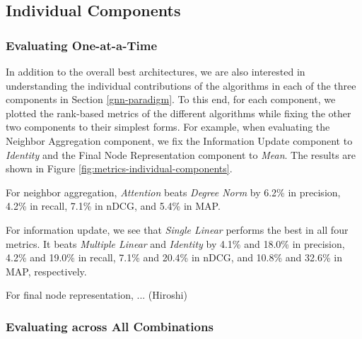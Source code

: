 \documentclass{article}
\begin{document}
\subsection{Individual Components} \label{eval-individual-components}

\subsubsection{Evaluating One-at-a-Time} \label{eval-one-at-a-time}



In addition to the overall best architectures, we are also interested in understanding the individual contributions of the algorithms in each of the three components in Section \ref{gnn-paradigm}. To this end, for each component, we plotted the rank-based metrics of the different algorithms while fixing the other two components to their simplest forms. For example, when evaluating the Neighbor Aggregation component, we fix the Information Update component to \textit{Identity} and the Final Node Representation component to \textit{Mean}. The results are shown in Figure \ref{fig:metrics-individual-components}.

For neighbor aggregation, \textit{Attention} beats \textit{Degree Norm} by 6.2\% in precision, 4.2\% in recall, 7.1\% in nDCG, and 5.4\% in MAP.

For information update, we see that \textit{Single Linear} performs the best in all four metrics. It beats \textit{Multiple Linear} and \textit{Identity} by 4.1\% and 18.0\% in precision, 4.2\% and 19.0\% in recall, 7.1\% and 20.4\% in nDCG, and 10.8\% and 32.6\% in MAP, respectively.

For final node representation, ... (Hiroshi)



\subsubsection{Evaluating across All Combinations}
\end{document}
